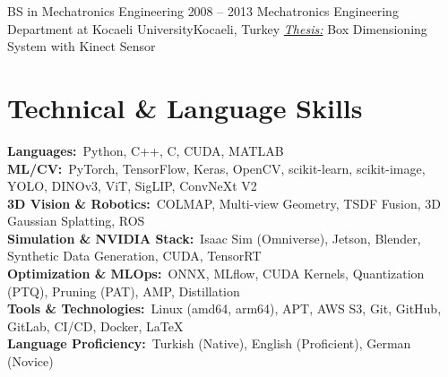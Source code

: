 \documentclass[letterpaper,11pt]{article}
\begin{document}
	  \resumeSubheading
      {BS in Mechatronics Engineering}
	  {2008 -- 2013}
      {Mechatronics Engineering Department at Kocaeli University}{Kocaeli, Turkey}
	  \textit{\underline{Thesis:}} Box Dimensioning System with Kinect Sensor
  \resumeSubHeadingListEnd
\vspace{-18pt} %

\providecommand{\skillsneed}{11.5\baselineskip}
\needspace{\skillsneed}
\section{Technical \& Language Skills}
 \begin{itemize}[leftmargin=0.15in, label={}]
    \small{\item{
     \textbf{Languages:}{~Python, C++, C, CUDA, MATLAB} \\
	 \textbf{ML/CV:}{~PyTorch, TensorFlow, Keras, OpenCV, scikit-learn, scikit-image, YOLO, DINOv3, ViT, SigLIP, ConvNeXt V2} \\
	 \textbf{3D Vision \& Robotics:}{~COLMAP, Multi-view Geometry, TSDF Fusion, 3D Gaussian Splatting, ROS} \\
	 \textbf{Simulation \& NVIDIA Stack:}{~Isaac Sim (Omniverse), Jetson, Blender, Synthetic Data Generation, CUDA, TensorRT} \\
	 \textbf{Optimization \& MLOps:}{~ONNX, MLflow, CUDA Kernels, Quantization (PTQ), Pruning (PAT), AMP, Distillation} \\
     \textbf{Tools \& Technologies:}{~Linux (amd64, arm64), APT, AWS S3, Git, GitHub, GitLab, CI/CD, Docker, \LaTeX} \\
	 \textbf{Language Proficiency:}{~Turkish (Native), English (Proficient), German (Novice)}
    }}
 \end{itemize}
 \vspace{-16pt}
\end{document}
